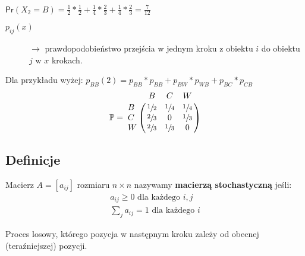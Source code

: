\begin{example*}
$\mathsf{Pr}(X_2=B)=\frac{1}{2}*\frac{1}{2}+\frac{1}{4}*\frac{2}{3}+\frac{1}{4}*\frac{2}{3}=\frac{7}{12}$
\begin{description}
\item[$p_{ij}(x)$] $\rightarrow$ prawdopodobieństwo przejścia w jednym kroku z obiektu $i$ do obiektu $j$ w $x$ krokach.
\end{description}
Dla przykładu wyżej: $p_{BB}(2)=p_{BB}*p_{BB}+p_{BW}*p_{WB}+p_{BC}*p_{CB}$ 
$$\mathbb{P}= \bordermatrix{~ & B & C & W \cr
                  B & \sfrac{1}{2} & \sfrac{1}{4} & \sfrac{1}{4} \cr
                  C & \sfrac{2}{3} & 0 & \sfrac{1}{3}\cr
                  W & \sfrac{2}{3} & \sfrac{1}{3} &0 \cr}$$
\end{example*}

\subsection{Definicje}
\begin{definition}
Macierz $A=[a_{ij}]$ rozmiaru $n\times n$ nazywamy \textbf{macierzą stochastyczną} jeśli:
\begin{align*}
a_{ij}\geq 0 \text{ dla każdego }i,j\\
\sum_j a_{ij}=1 \text{ dla każdego } i 
\end{align*}
\end{definition}
\begin{definition}
Proces losowy, którego pozycja w następnym kroku zależy od obecnej (teraźniejszej) pozycji.
\end{definition}

